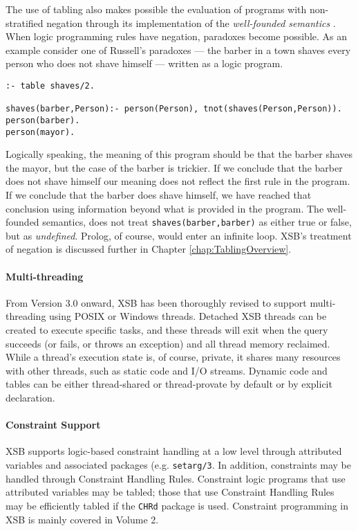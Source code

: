 \begin{example} \label{ex:Russell}
The use of tabling also makes possible the evaluation of programs with
non-stratified negation through its implementation of the {\em
well-founded semantics} \cite{VGRS91}.  When logic programming rules
have negation, paradoxes become possible.  As an example consider one
of Russell's paradoxes --- 
the barber in a town shaves every person who does not shave himself ---
written as a logic program.
\begin{center}
\begin{verbatim} 
:- table shaves/2.

shaves(barber,Person):- person(Person), tnot(shaves(Person,Person)).
person(barber).
person(mayor).
\end{verbatim} 
\end{center}
Logically speaking, the meaning of this program should be that the
barber shaves 
the mayor, but the case of the barber is trickier.  If we conclude
that the barber does not shave himself our meaning does not reflect the 
first rule in the program.  If we conclude that the barber does shave
himself, we have reached that conclusion using information beyond what 
is provided in the program.  The well-founded semantics, does not
treat {\tt shaves(barber,barber)} as either true or false, but as {\em
undefined}. 
Prolog, of course, would enter an infinite loop.  XSB's treatment of
negation is discussed further in Chapter \ref{chap:TablingOverview}.
\end{example}

\paragraph{Multi-threading} From Version 3.0 onward, XSB has been thoroughly
revised to support multi-threading using POSIX or Windows threads.
Detached XSB threads can be created to execute specific tasks, and
these threads will exit when the query succeeds (or fails, or throws
an exception) and all thread memory reclaimed.  While a thread's
execution state is, of course, private, it shares many resources with
other threads, such as static code and I/O streams.  Dynamic code and
tables can be either thread-shared or thread-provate by default or by
explicit declaration.

\paragraph{Constraint Support}
%
XSB supports logic-based constraint handling at a low level through
attributed variables and associated packages (e.g. {\tt setarg/3}.  In
addition, constraints may be handled through Constraint Handling
Rules.  Constraint logic programs that use attributed variables may be
tabled; those that use Constraint Handling Rules may be efficiently
tabled if the {\tt CHRd} package is used.  Constraint programming in
XSB is mainly covered in Volume 2.

